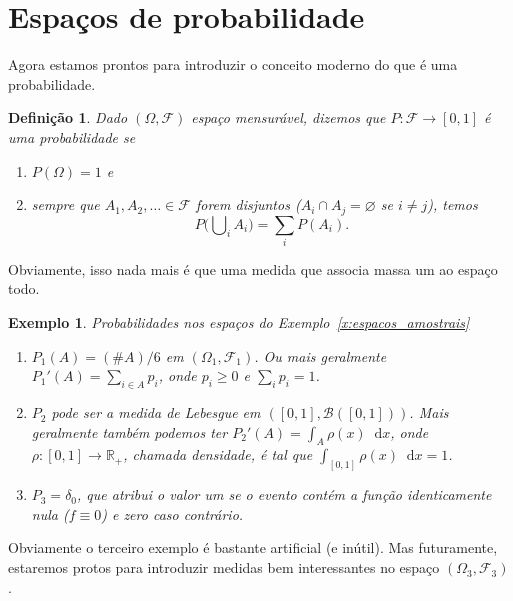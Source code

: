 \documentclass[reqno, draft]{book}
\newcommand*\1{\mathds{1}}
\newtheorem{definition}[theorem]{Definição}
\newtheorem{example}{Exemplo}[section]
\renewcommand*\d{\mathop{}\!\mathrm{d}}
\DeclareMathOperator*{\mcup}{{\textstyle \bigcup}}
\begin{document}
\section{Espaços de probabilidade}

Agora estamos prontos para introduzir o conceito moderno do que é uma probabilidade.

\begin{definition}
  Dado $(\Omega, \mathcal{F})$ espaço mensurável, dizemos que $P:\mathcal{F} \to [0,1]$ é uma \emph{probabilidade}  se
  \begin{enumerate}[\quad a)]
  \item $P(\Omega) = 1$ e
  \item sempre que $A_1, A_2, \dots \in \mathcal{F}$ forem disjuntos ($A_i \cap A_j = \varnothing$ se $i \neq j$), temos
    \begin{equation}
      P\big({\mcup\nolimits_i} A_i\big) = \sum_i P(A_i).
    \end{equation}
  \end{enumerate}
\end{definition}

Obviamente, isso nada mais é que uma medida que associa massa um ao espaço todo.

\begin{example} Probabilidades nos espaços do Exemplo~\ref{x:espacos_amostrais}
  \begin{enumerate}[\quad a)]
  \item $P_1(A) = (\#A)/6$ em $(\Omega_1, \mathcal{F}_1)$.
    Ou mais geralmente $P_1'(A) = \sum_{i \in A} p_i$, onde $p_i \geq 0$ e $\sum_i p_i = 1$.
  \item $P_2$ pode ser a medida de Lebesgue em $([0,1], \mathcal{B}([0,1]))$.
    Mais geralmente também podemos ter $P_2'(A) = \int_A \rho(x) \d x$, onde $\rho:[0,1] \to \mathbb{R}_+$, chamada densidade, é tal que $\int_{[0,1]} \rho (x) \d x = 1$.
  \item $P_3 = \delta_{0}$, que atribui o valor um se o evento contém a função identicamente nula ($f \equiv 0$) e zero caso contrário.
  \end{enumerate}
\end{example}
Obviamente o terceiro exemplo é bastante artificial (e inútil).
Mas futuramente, estaremos protos para introduzir medidas bem interessantes no espaço $(\Omega_3, \mathcal{F}_3)$.
\end{document}
